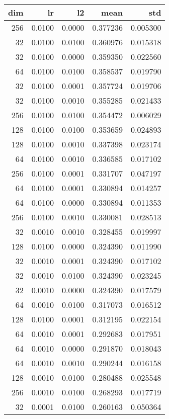 \begin{tabular}{rrrrr}
\toprule
 dim &      lr &      l2 &      mean &       std \\
\midrule
 256 &  0.0100 &  0.0000 &  0.377236 &  0.005300 \\
  32 &  0.0100 &  0.0100 &  0.360976 &  0.015318 \\
  32 &  0.0100 &  0.0000 &  0.359350 &  0.022560 \\
  64 &  0.0100 &  0.0100 &  0.358537 &  0.019790 \\
  32 &  0.0100 &  0.0001 &  0.357724 &  0.019706 \\
  32 &  0.0100 &  0.0010 &  0.355285 &  0.021433 \\
 256 &  0.0100 &  0.0100 &  0.354472 &  0.006029 \\
 128 &  0.0100 &  0.0100 &  0.353659 &  0.024893 \\
 128 &  0.0100 &  0.0010 &  0.337398 &  0.023174 \\
  64 &  0.0100 &  0.0010 &  0.336585 &  0.017102 \\
 256 &  0.0100 &  0.0001 &  0.331707 &  0.047197 \\
  64 &  0.0100 &  0.0001 &  0.330894 &  0.014257 \\
  64 &  0.0100 &  0.0000 &  0.330894 &  0.011353 \\
 256 &  0.0100 &  0.0010 &  0.330081 &  0.028513 \\
  32 &  0.0010 &  0.0010 &  0.328455 &  0.019997 \\
 128 &  0.0100 &  0.0000 &  0.324390 &  0.011990 \\
  32 &  0.0010 &  0.0001 &  0.324390 &  0.017102 \\
  32 &  0.0010 &  0.0100 &  0.324390 &  0.023245 \\
  32 &  0.0010 &  0.0000 &  0.324390 &  0.017579 \\
  64 &  0.0010 &  0.0100 &  0.317073 &  0.016512 \\
 128 &  0.0100 &  0.0001 &  0.312195 &  0.022154 \\
  64 &  0.0010 &  0.0001 &  0.292683 &  0.017951 \\
  64 &  0.0010 &  0.0000 &  0.291870 &  0.018043 \\
  64 &  0.0010 &  0.0010 &  0.290244 &  0.016158 \\
 128 &  0.0010 &  0.0100 &  0.280488 &  0.025548 \\
 256 &  0.0010 &  0.0100 &  0.268293 &  0.017719 \\
  32 &  0.0001 &  0.0100 &  0.260163 &  0.050364 \\

\end{tabular}
